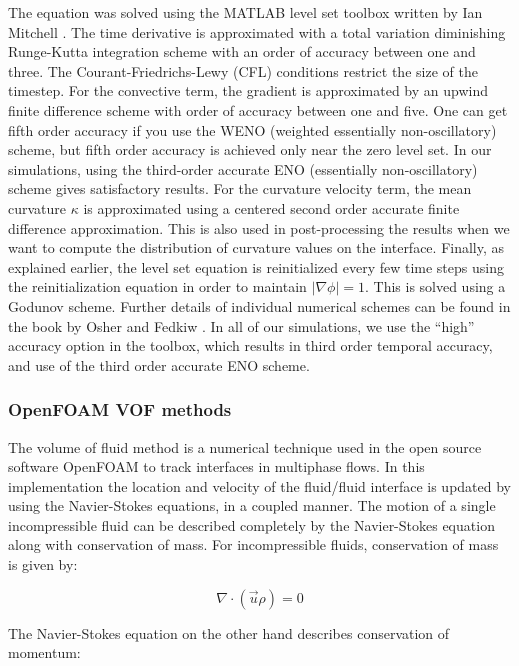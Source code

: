 The equation was solved using the MATLAB level set toolbox written by Ian Mitchell \cite{mitchell2004toolbox,mitchell2008flexible}. The time derivative is approximated with a total variation diminishing Runge-Kutta integration scheme with an order of accuracy between one and three. The Courant-Friedrichs-Lewy (CFL) conditions restrict the size of the timestep. For the convective term, the gradient is approximated by an upwind finite difference scheme with order of accuracy between one and five. One can get fifth order accuracy if you use the WENO (weighted essentially non-oscillatory) scheme, but fifth order accuracy is achieved only near the zero level set. In our simulations, using the third-order accurate ENO (essentially non-oscillatory) scheme gives satisfactory results. For the curvature velocity term, the mean curvature $\kappa$ is approximated using a centered second order accurate finite difference approximation. This is also used in post-processing the results when we want to compute the distribution of curvature values on the interface. Finally, as explained earlier, the level set equation is reinitialized every few time steps using the reinitialization equation in order to maintain $|\nabla\phi| = 1$. This is solved using a Godunov scheme.  Further details of individual numerical schemes can be found in the book by Osher and Fedkiw \cite{osher_level_2003}. In all of our simulations, we use the ``high'' accuracy option in the toolbox, which results in third order temporal accuracy, and use of the third order accurate ENO scheme. 


\subsubsection{OpenFOAM VOF methods}

The volume of fluid method is a numerical technique used in the open source software OpenFOAM to track interfaces in multiphase flows. In this implementation the location and velocity of the fluid/fluid interface is updated by using the Navier-Stokes equations, in a coupled manner. The motion of a single incompressible fluid can be described completely by the Navier-Stokes equation along with conservation of mass. For incompressible fluids, conservation of mass is given by:

\begin{equation}
\nabla \cdot (\vec{u}\rho) = 0
\label{eq:mass_conservation}
\end{equation}

The Navier-Stokes equation on the other hand describes conservation of momentum:

